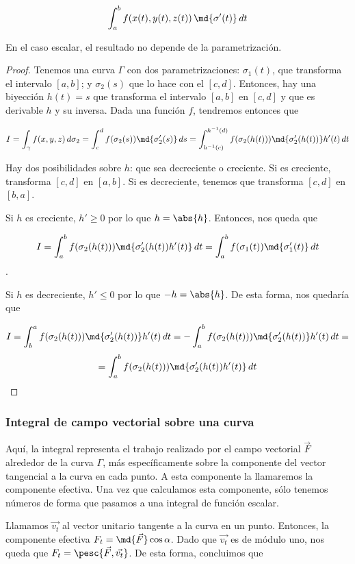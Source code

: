 \documentclass[12pt,a4paper,titlepage]{apuntes}
\begin{document}
\[ \int_a^b f(x(t), y(t), z(t))\,\md{\sigma'(t)}\,dt \]

\begin{theorem}
En el caso escalar, el resultado no depende de la parametrización.
\end{theorem}

\begin{proof}
Tenemos una curva $\Gamma$ con dos parametrizaciones: $\sigma_1(t)$, que transforma el intervalo $[a,b]$; y $\sigma_2(s)$ que lo hace con el $[c,d]$. Entonces, hay una biyección $h(t) = s$ que transforma el intervalo $[a,b]$ en $[c,d]$ y que es derivable $h$ y su inversa. Dada una función $f$, tendremos entonces que

\[ I = \int_\gamma f(x,y,z)\,d\sigma_2 = \int_c^df(\sigma_2(s))\md{\sigma_2'(s)}\,ds = \int_{h^{-1}(c)}^{h^{-1}(d)}f(\sigma_2(h(t)))\md{\sigma_2'(h(t))}h'(t)\,dt\]

Hay dos posibilidades sobre $h$: que sea decreciente o creciente. Si es creciente, transforma $[c,d]$ en $[a,b]$. Si es decreciente, tenemos que transforma $[c,d]$ en $[b,a]$.

Si $h$ es creciente, $h' ≥ 0$ por lo que $h = \abs{h}$. Entonces, nos queda que 

\[ I = \int_a^bf(\sigma_2(h(t)))\md{\sigma_2'(h(t))h'(t)}\,dt = \int_a^bf(\sigma_1(t))\md{\sigma_1'(t)}\,dt\].

Si $h$ es decreciente, $h' ≤ 0$ por lo que $-h = \abs{h}$. De esta forma, nos quedaría que

\[ I = \int_b^af(\sigma_2(h(t)))\md{\sigma_2'(h(t))}h'(t)\,dt = -\int_a^bf(\sigma_2(h(t)))\md{\sigma_2'(h(t))} h'(t)\,dt =\]\[= \int_a^bf(\sigma_2(h(t)))\md{\sigma_2'(h(t))h'(t)}\,dt \]
\end{proof}

\subsubsection{Integral de campo vectorial sobre una curva}

Aquí, la integral representa el trabajo realizado por el campo vectorial $\vec{F}$ alrededor de la curva $\Gamma$, más específicamente sobre la componente del vector tangencial a la curva en cada punto. A esta componente la llamaremos la componente efectiva. Una vez que calculamos esta componente, sólo tenemos números de forma que pasamos a una integral de función escalar.

Llamamos $\vec{v_t}$ al vector unitario tangente a la curva en un punto. Entonces, la componente efectiva $F_t = \md{\vec{F}} \cos \alpha$. Dado que $\vec{v_t}$ es de módulo uno, nos queda que $F_t = \pesc{\vec{F}, \vec{v_t}}$. De esta forma, concluimos que 
\end{document}
